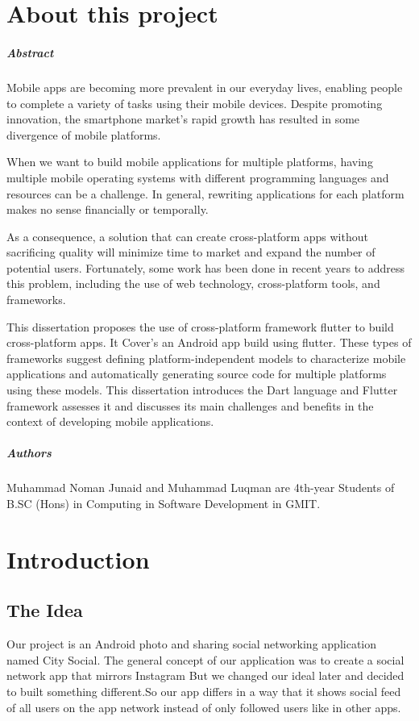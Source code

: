 
\chapter*{About this project}
\paragraph{Abstract}
Mobile apps are becoming more prevalent in our everyday lives, enabling people to complete a variety of tasks using their mobile devices. Despite promoting innovation, the smartphone market's rapid growth has resulted in some divergence of mobile platforms.

When we want to build mobile applications for multiple platforms, having multiple mobile operating systems with different programming languages and resources can be a challenge. In general, rewriting applications for each platform makes no sense financially or temporally.

As a consequence, a solution that can create cross-platform apps without sacrificing quality will minimize time to market and expand the number of potential users. Fortunately, some work has been done in recent years to address this problem, including the use of web technology, cross-platform tools, and frameworks.

This dissertation proposes the use of cross-platform framework flutter to build cross-platform apps. It Cover's an  Android app build using flutter. These types of frameworks suggest defining platform-independent models to characterize mobile applications and automatically generating source code for multiple platforms using these models.
This dissertation introduces the Dart language and Flutter framework assesses it and discusses its main challenges and benefits in the context of developing mobile applications.

\paragraph{Authors}
Muhammad Noman Junaid and Muhammad Luqman are 4th-year Students of B.SC (Hons) in Computing in Software Development in GMIT.



\chapter{Introduction}
\section{The Idea}
Our project is an Android photo and sharing social networking application named City Social. The general concept of our application was to create a social network app that mirrors Instagram But we changed our ideal later and decided to built something different.So our app differs in a way that it shows social feed of all users on the app network instead of only followed users like in other apps.

